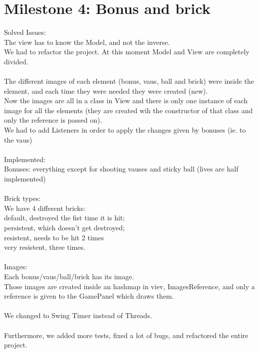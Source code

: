 \section*{Milestone 4: Bonus and brick}
\label{sec:m4}
Solved Issues:\\
The view has to know the Model, and not the inverse. \\
We had to refactor the project. At this moment Model and View are completely divided.\\
\\
The different images of each element (bonus, vaus, ball and brick) were inside the element, and each time they were needed they were created (new).\\
Now the images are all in a class in View and there is only one instance of each image for all the elements (they are created wih the constructor of that class and only the reference is passed on).\\
We had to add Listeners in order to apply the changes given by bonuses (ie. to the vaus)\\
\\
Implemented:\\
Bonuses: everything except for shooting vauses and sticky ball (lives are half implemented)\\
\\
Brick types: \\
We have 4 different bricks: \\
default, destroyed the fist time it is hit;\\
persistent, which doesn't get destroyed;\\
resistent, needs to be hit 2 times\\
very resistent, three times.\\
\\
Images:\\
Each bonus/vaus/ball/brick has its image. \\
Those images are created inside an hashmap in viev, ImagesReference, 
and only a reference is given to the GamePanel which draws them.\\
\\
We changed to Swing Timer instead of Threads.\\
\\
Furthermore, we added more tests, fixed a lot of bugs, and refactored the entire project.


